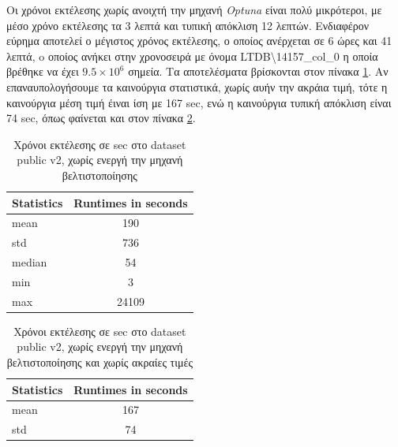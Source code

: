 Οι χρόνοι εκτέλεσης χωρίς ανοιχτή την μηχανή \emph{Optuna} είναι πολύ μικρότεροι, με μέσο χρόνο εκτέλεσης τα 3 λεπτά και τυπική απόκλιση 12 λεπτών. Ενδιαφέρον εύρημα αποτελεί ο μέγιστος χρόνος εκτέλεσης, ο οποίος ανέρχεται σε 6 ώρες και 41 λεπτά, o οποίος ανήκει στην χρονοσειρά με όνομα LTDB\textbackslash14157\_col\_0 η οποία βρέθηκε να έχει $9.5 \times 10^{6}$ σημεία. Τα αποτελέσματα βρίσκονται στον πίνακα \ref{optuna-off_runtime_pv2_with_outlier}. Αν επαναυπολογήσουμε τα καινούργια στατιστικά, χωρίς αυήν την ακράια τιμή, τότε η καινούργια μέση τιμή έιναι ίση με 167 sec, ενώ η καινούργια τυπική απόκλιση είναι 74 sec, όπως φαίνεται και στον πίνακα \ref{optuna-off_runtime_pv2_without_outlier}.
\begin{table}[h]
    \centering
    \caption{Χρόνοι εκτέλεσης σε sec στο dataset public v2, χωρίς ενεργή την μηχανή βελτιστοποίησης}
    \label{optuna-off_runtime_pv2_with_outlier} 
    \begin{tabular}{lc}
        \toprule
        Statistics & Runtimes in seconds \\
        \midrule
            mean & 190 \\
            std & 736 \\
            median & 54 \\
            min & 3 \\
            max & 24109 \\
        \bottomrule
    \end{tabular}
\end{table}

\begin{table}
    \centering
    \caption{Χρόνοι εκτέλεσης σε sec στο dataset public v2, χωρίς ενεργή την μηχανή βελτιστοποίησης και χωρίς ακραίες τιμές}
    \label{optuna-off_runtime_pv2_without_outlier} 
    \begin{tabular}{lc}
        \toprule
        Statistics & Runtimes in seconds \\
        \midrule
            mean & 167 \\
            std & 74 \\
        \bottomrule
    \end{tabular}
\end{table}

